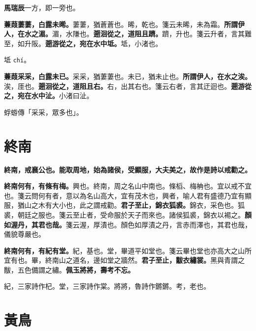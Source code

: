\begin{quoting}\textbf{馬瑞辰}一方，即一旁也。\end{quoting}

\textbf{蒹葭萋萋，白露未晞。}{\footnotesize 萋萋，猶蒼蒼也。晞，乾也。箋云未晞，未為霜。}\textbf{所謂伊人，在水之湄。}{\footnotesize 湄，水隒也。}\textbf{遡洄從之，道阻且躋。}{\footnotesize 躋，升也。箋云升者，言其難至，如升阪。}\textbf{遡游從之，宛在水中坻。}{\footnotesize 坻，小渚也。}

\begin{quoting}坻 \texttt{chí}。\end{quoting}

\textbf{蒹葭采采，白露未已。}{\footnotesize 采采，猶萋萋也。未已，猶未止也。}\textbf{所謂伊人，在水之涘。}{\footnotesize 涘，厓也。}\textbf{遡洄從之，道阻且右。}{\footnotesize 右，出其右也。箋云右者，言其迂迴也。}\textbf{遡游從之，宛在水中沚。}{\footnotesize 小渚曰沚。}

\begin{quoting}蜉蝣傳「采采，眾多也」。\end{quoting}

\section{終南}


\textbf{終南，戒襄公也。能取周地，始為諸侯，受顯服，大夫美之，故作是詩以戒勸之。}

\textbf{終南何有，有條有梅。}{\footnotesize 興也。終南，周之名山中南也。條槄、梅柟也。宜以戒不宜也。箋云問何有者，意以為名山高大，宜有茂木也，興者，喻人君有盛德乃宜有顯服，猶山之木有大小也，此之謂戒勸。}\textbf{君子至止，錦衣狐裘。}{\footnotesize 錦衣，采色也。狐裘，朝廷之服也。箋云至止者，受命服於天子而來也。諸侯狐裘，錦衣以裼之。}\textbf{顏如渥丹，其君也哉。}{\footnotesize 箋云渥，厚漬也。顏色如厚漬之丹，言赤而澤也，其君也哉，儀貌尊嚴也。}

\textbf{終南何有，有紀有堂。}{\footnotesize 紀，基也。堂，畢道平如堂也。箋云畢也堂也亦高大之山所宜有也。畢，終南山之道名，邊如堂之牆然。}\textbf{君子至止，黻衣繡裳。}{\footnotesize 黑與青謂之黻，五色備謂之繡。}\textbf{佩玉將將，壽考不忘。}

\begin{quoting}紀，三家詩作杞。堂，三家詩作棠。將將，魯詩作鏘鏘。考，老也。\end{quoting}

\section{黃鳥}

